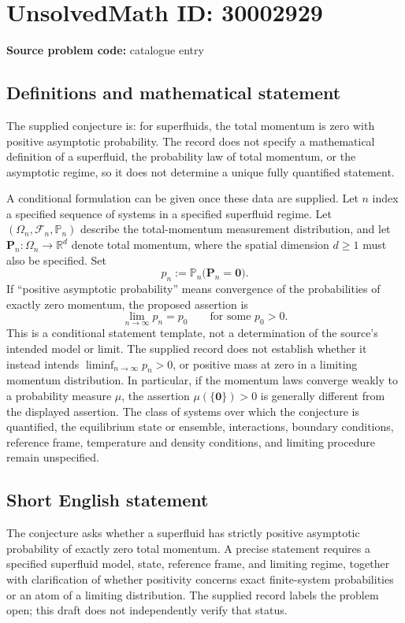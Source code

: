 \documentclass[11pt]{article}
\newcommand{\R}{\mathbb{R}}
\begin{document}
\section*{UnsolvedMath ID: 30002929}
\textbf{Source problem code:} catalogue entry
\subsection{Definitions and mathematical statement}
The supplied conjecture is: for superfluids, the total momentum is zero with positive asymptotic probability. The record does not specify a mathematical definition of a superfluid, the probability law of total momentum, or the asymptotic regime, so it does not determine a unique fully quantified statement.

A conditional formulation can be given once these data are supplied. Let \(n\) index a specified sequence of systems in a specified superfluid regime. Let \((\Omega_n,\mathcal F_n,\mathbb P_n)\) describe the total-momentum measurement distribution, and let \(\mathbf P_n:\Omega_n\to\R^d\) denote total momentum, where the spatial dimension \(d\geq 1\) must also be specified. Set
\[
p_n:=\mathbb P_n\bigl(\mathbf P_n=\mathbf 0\bigr).
\]
If ``positive asymptotic probability'' means convergence of the probabilities of exactly zero momentum, the proposed assertion is
\[
\lim_{n\to\infty}p_n=p_0\qquad\text{for some }p_0>0.
\]
This is a conditional statement template, not a determination of the source's intended model or limit. The supplied record does not establish whether it instead intends \(\liminf_{n\to\infty}p_n>0\), or positive mass at zero in a limiting momentum distribution. In particular, if the momentum laws converge weakly to a probability measure \(\mu\), the assertion \(\mu(\{\mathbf 0\})>0\) is generally different from the displayed assertion. The class of systems over which the conjecture is quantified, the equilibrium state or ensemble, interactions, boundary conditions, reference frame, temperature and density conditions, and limiting procedure remain unspecified.
\subsection{Short English statement}
The conjecture asks whether a superfluid has strictly positive asymptotic probability of exactly zero total momentum. A precise statement requires a specified superfluid model, state, reference frame, and limiting regime, together with clarification of whether positivity concerns exact finite-system probabilities or an atom of a limiting distribution. The supplied record labels the problem open; this draft does not independently verify that status.
\end{document}
